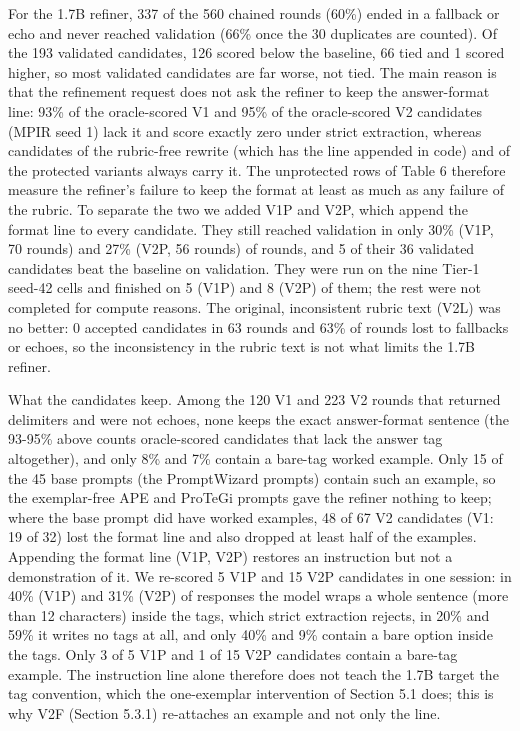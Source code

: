 \documentclass{ieeeaccess}
\begin{document}
For the 1.7B refiner, 337 of the 560 chained rounds (60\%) ended in a fallback or echo and never reached validation (66\% once the 30 duplicates are counted). Of the 193 validated candidates, 126 scored below the baseline, 66 tied and 1 scored higher, so most validated candidates are far worse, not tied. The main reason is that the refinement request does not ask the refiner to keep the answer-format line: 93\% of the oracle-scored V1 and 95\% of the oracle-scored V2 candidates (MPIR seed 1) lack it and score exactly zero under strict extraction, whereas candidates of the rubric-free rewrite (which has the line appended in code) and of the protected variants always carry it. The unprotected rows of Table 6 therefore measure the refiner's failure to keep the format at least as much as any failure of the rubric. To separate the two we added V1P and V2P, which append the format line to every candidate. They still reached validation in only 30\% (V1P, 70 rounds) and 27\% (V2P, 56 rounds) of rounds, and 5 of their 36 validated candidates beat the baseline on validation. They were run on the nine Tier-1 seed-42 cells and finished on 5 (V1P) and 8 (V2P) of them; the rest were not completed for compute reasons. The original, inconsistent rubric text (V2L) was no better: 0 accepted candidates in 63 rounds and 63\% of rounds lost to fallbacks or echoes, so the inconsistency in the rubric text is not what limits the 1.7B refiner.

What the candidates keep. Among the 120 V1 and 223 V2 rounds that returned delimiters and were not echoes, none keeps the exact answer-format sentence (the 93-95\% above counts oracle-scored candidates that lack the answer tag altogether), and only 8\% and 7\% contain a bare-tag worked example. Only 15 of the 45 base prompts (the PromptWizard prompts) contain such an example, so the exemplar-free APE and ProTeGi prompts gave the refiner nothing to keep; where the base prompt did have worked examples, 48 of 67 V2 candidates (V1: 19 of 32) lost the format line and also dropped at least half of the examples. Appending the format line (V1P, V2P) restores an instruction but not a demonstration of it. We re-scored 5 V1P and 15 V2P candidates in one session: in 40\% (V1P) and 31\% (V2P) of responses the model wraps a whole sentence (more than 12 characters) inside the tags, which strict extraction rejects, in 20\% and 59\% it writes no tags at all, and only 40\% and 9\% contain a bare option inside the tags. Only 3 of 5 V1P and 1 of 15 V2P candidates contain a bare-tag example. The instruction line alone therefore does not teach the 1.7B target the tag convention, which the one-exemplar intervention of Section 5.1 does; this is why V2F (Section 5.3.1) re-attaches an example and not only the line.
\end{document}
